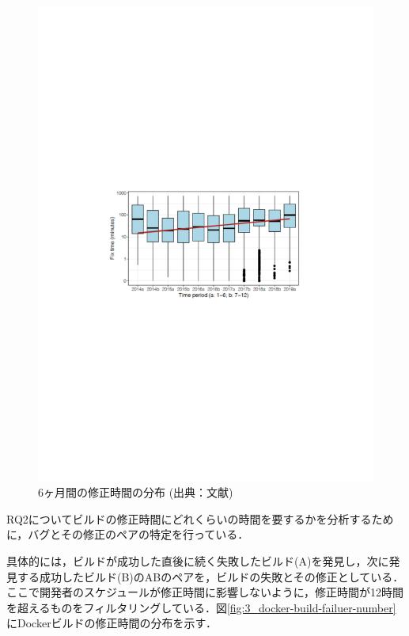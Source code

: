 \begin{figure}[t]
    \centering
    \includegraphics[width=0.9\linewidth, angle=0]{./thesis3/docker-build-fix-time-period3.pdf}
    \caption{6ヶ月間の修正時間の分布 (出典：文献\cite{docker-failures})}
    \label{fig:3_docker-build-fix-time-period}
\end{figure}

RQ2についてビルドの修正時間にどれくらいの時間を要するかを分析するために，バグとその修正のペアの特定を行っている．


具体的には，ビルドが成功した直後に続く失敗したビルド(A)を発見し，次に発見する成功したビルド(B)のABのペアを，ビルドの失敗とその修正としている．ここで開発者のスケジュールが修正時間に影響しないように，修正時間が12時間を超えるものをフィルタリングしている．図\ref{fig:3_docker-build-failuer-number}にDockerビルドの修正時間の分布を示す．

